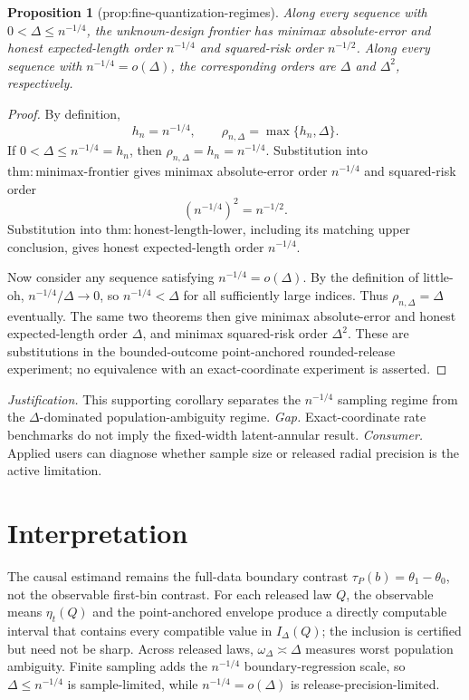\documentclass{article}
\newtheorem{proposition}{Proposition}
\begin{document}
\begin{proposition}[prop:fine-quantization-regimes]\label{prop:fine-quantization-regimes}
Along every sequence with \(0<\Delta\leq n^{-1/4}\), the unknown-design frontier has minimax absolute-error and honest expected-length order \(n^{-1/4}\) and squared-risk order \(n^{-1/2}\).  Along every sequence with \(n^{-1/4}=o(\Delta)\), the corresponding orders are \(\Delta\) and \(\Delta^2\), respectively.
\end{proposition}
\begin{proof}
By definition,
\[
 h_n=n^{-1/4},
 \qquad
 \rho_{n,\Delta}=\max\{h_n,\Delta\}.
\]
If \(0<\Delta\leq n^{-1/4}=h_n\), then \(\rho_{n,\Delta}=h_n=n^{-1/4}\).  Substitution into \(\mathrm{thm:minimax\text{-}frontier}\) gives minimax absolute-error order \(n^{-1/4}\) and squared-risk order
\[
 (n^{-1/4})^2=n^{-1/2}.
\]
Substitution into \(\mathrm{thm:honest\text{-}length\text{-}lower}\), including its matching upper conclusion, gives honest expected-length order \(n^{-1/4}\).

Now consider any sequence satisfying \(n^{-1/4}=o(\Delta)\).  By the definition of little-oh, \(n^{-1/4}/\Delta\to0\), so \(n^{-1/4}<\Delta\) for all sufficiently large indices.  Thus \(\rho_{n,\Delta}=\Delta\) eventually.  The same two theorems then give minimax absolute-error and honest expected-length order \(\Delta\), and minimax squared-risk order \(\Delta^2\).  These are substitutions in the bounded-outcome point-anchored rounded-release experiment; no equivalence with an exact-coordinate experiment is asserted.
\end{proof}
\par\smallskip\noindent \textit{Justification.} This supporting corollary separates the \(n^{-1/4}\) sampling regime from the \(\Delta\)-dominated population-ambiguity regime. \textit{Gap.} Exact-coordinate rate benchmarks do not imply the fixed-width latent-annular result. \textit{Consumer.} Applied users can diagnose whether sample size or released radial precision is the active limitation.

\section{Interpretation}

The causal estimand remains the full-data boundary contrast \(\tau_P(b)=\theta_1-\theta_0\), not the observable first-bin contrast. For each released law \(Q\), the observable means \(\eta_t(Q)\) and the point-anchored envelope produce a directly computable interval that contains every compatible value in \(I_\Delta(Q)\); the inclusion is certified but need not be sharp. Across released laws, \(\omega_\Delta\asymp\Delta\) measures worst population ambiguity. Finite sampling adds the \(n^{-1/4}\) boundary-regression scale, so \(\Delta\leq n^{-1/4}\) is sample-limited, while \(n^{-1/4}=o(\Delta)\) is release-precision-limited.
\end{document}
